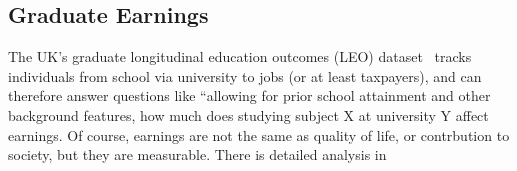 \documentclass[conference]{IEEEtran}
\begin{document}
%
%
%

\subsection{Graduate Earnings}

The UK's  graduate longitudinal education outcomes (LEO) dataset~\cite{DfE2017a} tracks individuals from school via university to jobs (or at least taxpayers), and can therefore answer questions like ``allowing for prior school attainment and other background features, how much does studying subject X at university Y affect earnings.  Of course, earnings are not the same as quality of life, or contrbution to society, but they are measurable. There is detailed analysis in \cite[\S IIB, IIC]{davenport-et-al:cep2019}
\end{document}
